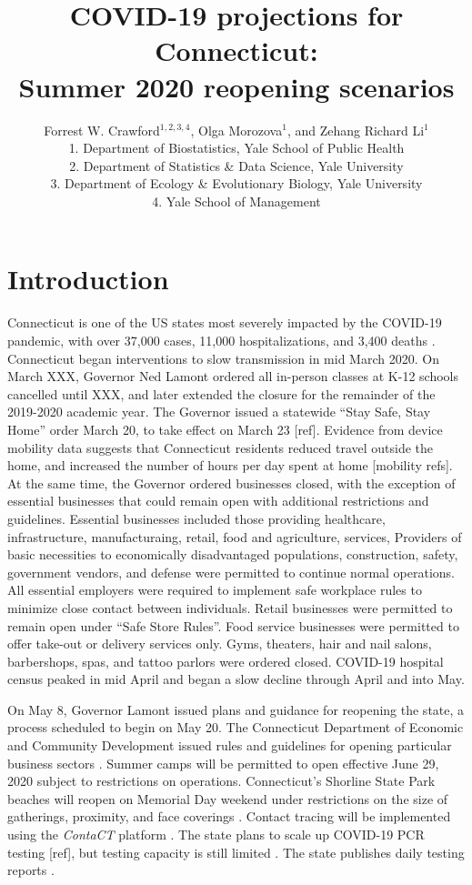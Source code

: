 \documentclass[11pt]{article}
\title{COVID-19 projections for Connecticut: \\ Summer 2020 reopening scenarios}
\author{
  Forrest W. Crawford$^{1,2,3,4}$,
  Olga Morozova$^{1}$, 
  and
  Zehang Richard Li$^1$
  \\[1em]
\small 1. Department of Biostatistics, Yale School of Public Health \\
\small 2. Department of Statistics \& Data Science, Yale University \\
\small 3. Department of Ecology \& Evolutionary Biology, Yale University \\
\small 4. Yale School of Management }
\begin{document}
\maketitle



\section*{Introduction}

Connecticut is one of the US states most severely impacted by the COVID-19 pandemic, with over 37,000 cases, 11,000 hospitalizations, and 3,400 deaths \citep{nyt2020Connecticut,atlantic2020data}. 
Connecticut began interventions to slow transmission in mid March 2020.  On March XXX, Governor Ned Lamont ordered all in-person classes at K-12 schools cancelled until XXX, and later extended the closure for the remainder of the 2019-2020 academic year.  The Governor issued a statewide ``Stay Safe, Stay Home'' order March 20, to take effect on March 23 [ref].  Evidence from device mobility data suggests that Connecticut residents reduced travel outside the home, and increased the number of hours per day spent at home [mobility refs].  At the same time, the Governor ordered businesses closed, with the exception of essential businesses that could remain open with additional restrictions and guidelines.  Essential businesses included those providing healthcare, infrastructure, manufacturaing, retail, food and agriculture, services, Providers of basic necessities to economically disadvantaged populations, construction, safety, government vendors, and defense were permitted to continue normal operations.  All essential employers were required to implement safe workplace rules to minimize close contact between individuals.  Retail businesses were permitted to remain open under ``Safe Store Rules''. Food service businesses were permitted to offer take-out or delivery services only. Gyms, theaters, hair and nail salons, barbershops, spas, and tattoo parlors were ordered closed.  COVID-19 hospital census peaked in mid April and began a slow decline through April and into May.   



On May 8, Governor Lamont issued plans and guidance for reopening the state, a process scheduled to begin on May 20.  The Connecticut Department of Economic and Community Development issued rules and guidelines for opening particular business sectors \citep{decd2020coronavirus}. Summer camps will be permitted to open effective June 29, 2020 subject to restrictions on operations.  Connecticut's Shorline State Park beaches will reopen on Memorial Day weekend under restrictions on the size of gatherings, proximity, and face coverings \citep{ct2020parks}.  Contact tracing will be implemented using the \emph{ContaCT} platform \citep{ct2020contact}.  The state plans to scale up COVID-19 PCR testing [ref], but testing capacity is still limited \cite{thomas2020surge}. The state publishes daily testing reports \citep[e.g.][]{ct2020testing}. 
\end{document}
